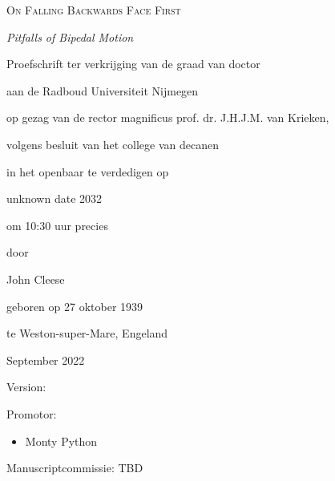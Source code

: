 \begin{titlepage}
    \thispagestyle{empty}
    \begin{center}
        {\LARGE\scshape On Falling Backwards Face First\par}
        {\Large\slshape Pitfalls of Bipedal Motion\par}
        \vspace{3em}
        {Proefschrift ter verkrijging van de graad van doctor\par aan de Radboud Universiteit Nijmegen\par
         op gezag van de rector magnificus prof. dr. J.H.J.M. van Krieken,\par
         volgens besluit van het college van decanen\par in het openbaar te verdedigen op\par}
        \vspace{2em}
        {unknown date 2032\par om 10:30 uur precies\par}
        \vspace{2em}
        {door\par John Cleese\par geboren op 27 oktober 1939\par te Weston-super-Mare, Engeland\par}
        \vspace{1.5em}
        {\large\color{red} September 2022\par Version: \version{}\par}
    \end{center}
    \vfill{}
\end{titlepage}

{\thispagestyle{empty}
Promotor:
\begin{itemize}
    \item[] Monty Python
\end{itemize}

Manuscriptcommissie: TBD}
\cleardoublepage{}
